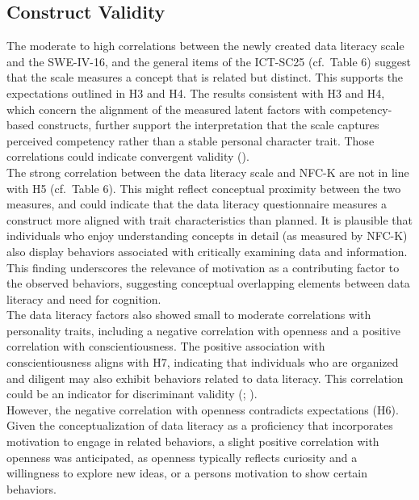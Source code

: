 \documentclass[
  12pt,
  a4paper,
  twoside]{article}
\begin{document}
\subsection{Construct Validity}\label{construct-validity}

The moderate to high correlations between the newly created data literacy scale and the SWE-IV-16, and the general items of the ICT-SC25 (cf.~Table 6) suggest that the scale measures a concept that is related but distinct.
This supports the expectations outlined in H3 and H4.
The results consistent with H3 and H4, which concern the alignment of the measured latent factors with competency-based constructs, further support the interpretation that the scale captures perceived competency rather than a stable personal character trait.
Those correlations could indicate convergent validity ().\\
The strong correlation between the data literacy scale and NFC-K are not in line with H5 (cf.~Table 6).
This might reflect conceptual proximity between the two measures, and could indicate that the data literacy questionnaire measures a construct more aligned with trait characteristics than planned.
It is plausible that individuals who enjoy understanding concepts in detail (as measured by NFC-K) also display behaviors associated with critically examining data and information. This finding underscores the relevance of motivation as a contributing factor to the observed behaviors, suggesting conceptual overlapping elements between data literacy and need for cognition.\\
The data literacy factors also showed small to moderate correlations with personality traits, including a negative correlation with openness and a positive correlation with conscientiousness. The positive association with conscientiousness aligns with H7, indicating that individuals who are organized and diligent may also exhibit behaviors related to data literacy.
This correlation could be an indicator for discriminant validity (; ).\\
However, the negative correlation with openness contradicts expectations (H6).
Given the conceptualization of data literacy as a proficiency that incorporates motivation to engage in related behaviors, a slight positive correlation with openness was anticipated, as openness typically reflects curiosity and a willingness to explore new ideas, or a persons motivation to show certain behaviors.
\end{document}
